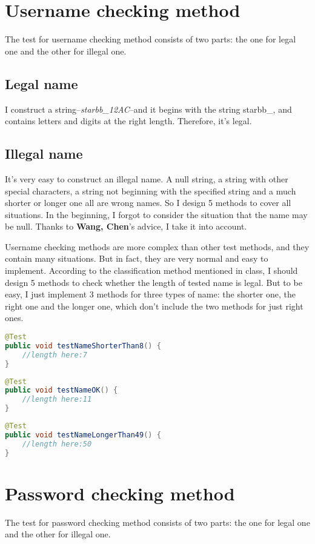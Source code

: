 \documentclass[a4paper]{report}
\begin{document}
\section{Username checking method}
\par The test for username checking method consists of two parts: the one for legal one and the other for illegal one.
\subsection{Legal name}
\par I construct a string--\emph{starbb\_12AC}--and it begins with the string starbb\_, and contains letters and digits at the right length. Therefore, it's legal.
\subsection{Illegal name}
\par It's very easy to construct an illegal name. A null string, a string with other special characters, a string not beginning with the specified string and a much shorter or longer one all are wrong names. So I design 5 methods to cover all situations. In the beginning, I forgot to consider the situation that the name may be null. Thanks to \textbf{Wang, Chen}'s advice, I take it into account.
\par Username checking methods are more complex than other test methods, and they contain many situations. But in fact, they are very normal and easy to implement. According to the classification method mentioned in class, I should design 5 methods to check whether the length of tested name is legal. But to be easy, I just implement 3 methods for three types of name: the shorter one, the right one and the longer one, which don't include the two methods for just right ones.
\begin{lstlisting}[language=java]
@Test
public void testNameShorterThan8() {
    //length here:7
}
\end{lstlisting}
\begin{lstlisting}[language=java]
@Test
public void testNameOK() {
    //length here:11
}
\end{lstlisting}
\begin{lstlisting}[language=java]
@Test
public void testNameLongerThan49() {
    //length here:50
}
\end{lstlisting}
\section{Password checking method}
\par The test for password checking method consists of two parts: the one for legal one and the other for illegal one.
\end{document}
